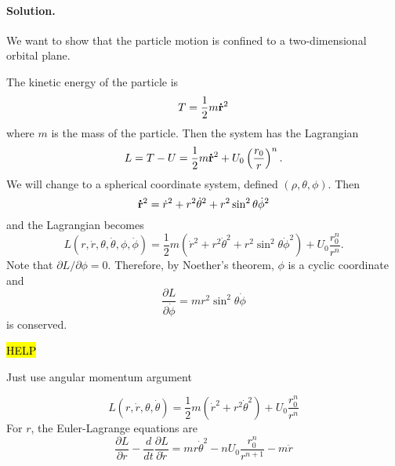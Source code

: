 \documentclass[11pt]{article}
\newcommand{\pder}[2]{\frac{\partial#1}{\partial#2}}
\newcommand{\der}[2]{\frac{d#1}{d#2}}
\newenvironment{solution}
{
    \paragraph{Solution.}
    \ignorespaces
}
{
    \bigskip\bigskip
}
\begin{document}
\begin{enumerate}
	\newcommand{\rd}{\dot{r}}
	\newcommand{\rdd}{\ddot{r}}
	\newcommand{\thetad}{\dot{\theta}}
	\newcommand{\phid}{\dot{\phi}}
		
	\begin{solution}
		We want to show that the particle motion is confined to a two-dimensional orbital plane.
		
		The kinetic energy of the particle is
		\begin{equation}
			T = \frac{1}{2} m \mathbf{\dot{r}}^2
		\end{equation}
		where $m$ is the mass of the particle.  Then the system has the Lagrangian
		\begin{equation}
			L = T - U = \frac{1}{2} m \mathbf{\dot{r}}^2 + U_0 \left( \frac{r_0}{r} \right)^n.
		\end{equation}
		We will change to a spherical coordinate system, defined $(\rho, \theta, \phi)$.  Then
		\begin{equation}
			\vrd^2 = \rd^2 + r^2 \thetad^2 + r^2 \sin^2\theta \phid^2
		\end{equation}
		and the Lagrangian becomes
		\begin{equation}
			L(r, \rd, \theta, \thetad, \phi, \phid) = \frac{1}{2} m \left( \rd^2 + r^2 \thetad^2 + r^2 \sin^2\theta \phid^2 \right) + U_0 \frac{r_0^n}{r^n}.
		\end{equation}
		Note that $\partial L / \partial \phi = 0$.  Therefore, by Noether's theorem, $\phi$ is a cyclic coordinate and
		\begin{equation}
			\pder{L}{\phid} = m r^2 \sin^2\theta \phid
		\end{equation}
		is conserved.

\hl{HELP}

		Just use angular momentum argument
		
		\begin{equation}
			L(r, \rd, \theta, \thetad) = \frac{1}{2} m \left(\rd^2 + r^2 \thetad^2 \right) + U_0 \frac{r_0^n}{r^n}
		\end{equation}
		For $r$, the Euler-Lagrange equations are
		\begin{equation}
			\pder{L}{r} - \der{}{t} \pder{L}{\rd} = m r \thetad^2 - n U_0 \frac{r_0^n}{r^{n+1}} - m \rdd
		\end{equation}
		
	\end{solution}

	

\end{enumerate}
\end{document}
